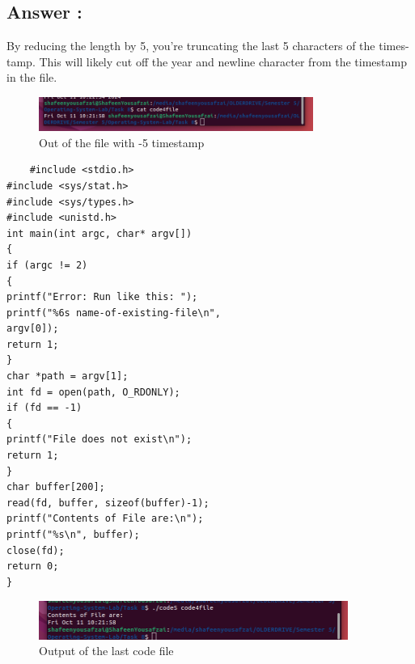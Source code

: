 \documentclass[12pt]{article}
\begin{document}
\subsection{Answer :}
By
reducing the length by 5, you’re truncating the last 5 characters of the times-
tamp. This will likely cut off the year and newline character from the timestamp
in the file.
\begin{figure}
    \centering
    \includegraphics[width=0.8\textwidth]{2.png}
    \caption{Out of the file with -5 timestamp}
    \label{fig:enter-label}
\end{figure}

\begin{verbatim}
    #include <stdio.h>
#include <sys/stat.h>
#include <sys/types.h>
#include <unistd.h>
int main(int argc, char* argv[])
{
if (argc != 2)
{
printf("Error: Run like this: ");
printf("%6s name-of-existing-file\n",
argv[0]);
return 1;
}
char *path = argv[1];
int fd = open(path, O_RDONLY);
if (fd == -1)
{
printf("File does not exist\n");
return 1;
}
char buffer[200];
read(fd, buffer, sizeof(buffer)-1);
printf("Contents of File are:\n");
printf("%s\n", buffer);
close(fd);
return 0;
}

\end{verbatim}
\begin{figure}[H]
    \centering
    \includegraphics[width=0.9\textwidth]{3.png}
    \caption{Output of the last code file}
    \label{fig:enter-label}
\end{figure}
\end{document}
